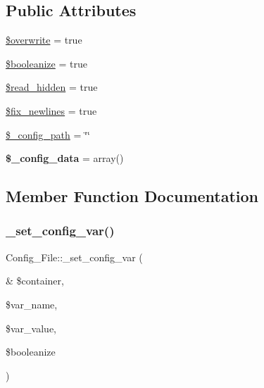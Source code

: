 \subsection*{Public Attributes}
\begin{DoxyCompactItemize}
\item 
\mbox{\hyperlink{class_config___file_aef9dda1733d085813ef4a25bf3aa5fc2}{\$overwrite}} = true
\item 
\mbox{\hyperlink{class_config___file_a0d28d4c9895be0cb0336617a43d870f5}{\$booleanize}} = true
\item 
\mbox{\hyperlink{class_config___file_a307a0b642dd8c23506cd60a098ec7e33}{\$read\+\_\+hidden}} = true
\item 
\mbox{\hyperlink{class_config___file_a6108c13db43f8eceae68cf6a7e777474}{\$fix\+\_\+newlines}} = true
\item 
\mbox{\hyperlink{class_config___file_af954710a61dd350440caf97c9cb5b84b}{\$\+\_\+config\+\_\+path}} = \char`\"{}\char`\"{}
\item 
\mbox{\label{class_config___file_a9b58535cfc07597598f51e9421f69a17}} 
{\bfseries \$\+\_\+config\+\_\+data} = array()
\end{DoxyCompactItemize}


\subsection{Member Function Documentation}
\mbox{\label{class_config___file_ae37ca20f4359111f62b05e9c18e3fce7}} 
\subsubsection{\texorpdfstring{\+\_\+set\+\_\+config\+\_\+var()}{\_set\_config\_var()}}
{\footnotesize\ttfamily Config\+\_\+\+File\+::\+\_\+set\+\_\+config\+\_\+var (\begin{DoxyParamCaption}\item[{\&}]{\$container,  }\item[{}]{\$var\+\_\+name,  }\item[{}]{\$var\+\_\+value,  }\item[{}]{\$booleanize }\end{DoxyParamCaption})}

